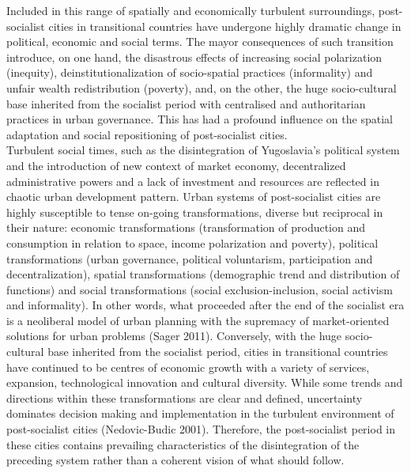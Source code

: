 \documentclass[11pt]{report}
\begin{document}
Included in this range of spatially and economically turbulent surroundings, post-socialist cities in transitional countries have undergone highly dramatic change in political, economic and social terms. The mayor consequences of such  transition introduce, on one hand, the disastrous effects of increasing social polarization (inequity), deinstitutionalization of socio-spatial practices (informality) and unfair wealth redistribution (poverty), and, on the other, the huge socio-cultural base inherited from the socialist period with centralised and authoritarian practices in urban governance. This has had a profound influence on the spatial adaptation and social repositioning of post-socialist cities.
\\
Turbulent social times, such as the disintegration of Yugoslavia’s political system and the introduction of new context of market economy, decentralized administrative powers and a lack of investment and resources are reflected in chaotic urban development pattern. Urban systems of post-socialist cities are highly susceptible to tense on-going transformations, diverse but reciprocal in their nature: economic transformations (transformation of production and consumption in relation to space, income polarization and poverty), political transformations (urban governance, political voluntarism, participation and decentralization), spatial transformations (demographic trend and distribution of functions) and social transformations (social exclusion-inclusion, social activism and informality). In other words, what proceeded after the end of the socialist era is a neoliberal model of urban planning with the supremacy of market-oriented solutions for urban problems (Sager 2011). Conversely, with the huge socio-cultural base inherited from the socialist period, cities in transitional countries have continued to be centres of economic growth with a variety of services, expansion, technological innovation and cultural diversity. While some trends and directions within these transformations are clear and defined, uncertainty dominates decision making and implementation in the turbulent environment of post-socialist cities (Nedovic-Budic 2001). Therefore, the post-socialist period in these cities contains prevailing characteristics of the disintegration of the preceding system rather than a coherent vision of what should follow. 
\\
\end{document}
